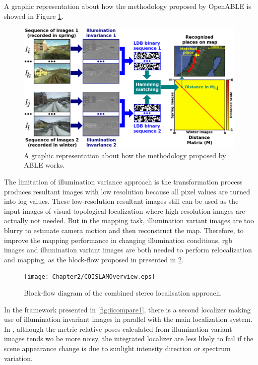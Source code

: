 A graphic representation about how the methodology proposed by OpenABLE is showed in Figure \ref{fig:openableoverview}.

\begin{figure}[H]
	\centering
	\includegraphics[width=5in]{Chapter2/OPENABLEOverview.eps}
	\caption{A graphic representation about how the methodology proposed by ABLE works.}
	\label{fig:openableoverview} 
\end{figure}

The limitation of illumination variance approach is the transformation process produces resultant images with low resolution because all pixel values are turned into log values. These low-resolution resultant images still can be used as the input images of visual topological localization where high resolution images are actually not needed. But in the mapping task, illumination variant images are too blurry to estimate camera motion and then reconstruct the map. Therefore, to improve the mapping performance in changing illumination conditions, rgb images and illumination variant images are both needed to perform relocalization and mapping, as the block-flow proposed in \cite{mcmanus2014shady} presented in \ref{fig:iioverview}.

\begin{figure}[H]
	\centering
	\texttt{[image: Chapter2/COISLAMOverview.eps]}
	\caption{Block-flow diagram of the combined stereo localisation approach.}
	\label{fig:iioverview} 
\end{figure}

In the framework presented in \ref{fig:iicompare1}, there is a second localizer making use of illumination invariant images in parallel with the main localization system. In \cite{maddern2014illumination}, although the metric relative poses calculated from illumination variant images tends wo be more noisy, the integrated localizer are less likely to fail if the scene appearance change is due to sunlight intensity direction or spectrum variation.

\newpage
